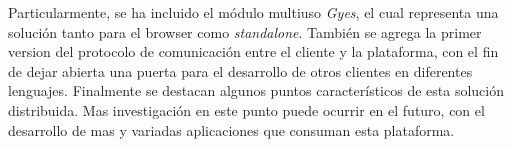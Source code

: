 Particularmente, se ha incluido el módulo multiuso \emph{Gyes}, el cual representa una solución tanto para el browser como \emph{standalone}. También se agrega la primer version del protocolo de comunicación entre el cliente y la plataforma, con el fin de dejar abierta una puerta para el desarrollo de otros clientes en diferentes lenguajes. Finalmente se destacan algunos puntos característicos de esta solución distribuida. Mas investigación en este punto puede ocurrir en el futuro, con el desarrollo de mas y variadas aplicaciones que consuman esta plataforma.